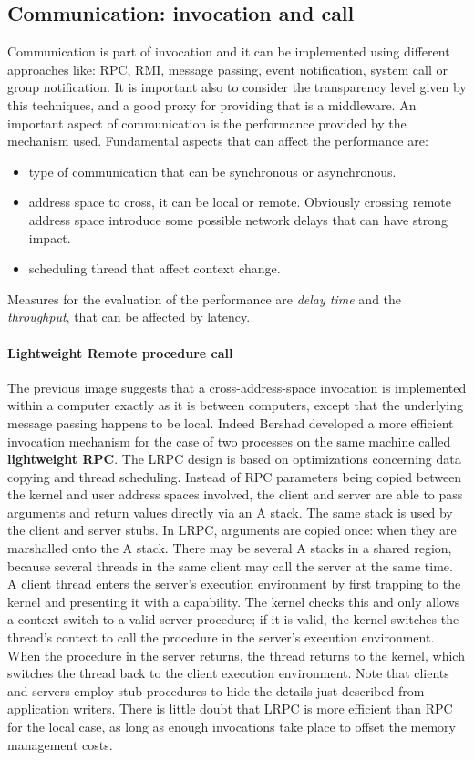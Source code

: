 \subsection{Communication: invocation and call}
Communication is part of invocation and it can be implemented using different approaches like: RPC, RMI, message passing, event notification, system call or group notification. It is important also to consider the transparency level given by this techniques, and a good proxy for providing that is a middleware. An important aspect of communication is the performance provided by the mechanism used. Fundamental aspects that can affect the performance are:
\begin{itemize}
	\item type of communication that can be synchronous or asynchronous.
	\item address space to cross, it can be local or remote. Obviously crossing remote address space introduce some possible network delays that can have strong impact.
	\item scheduling thread that affect context change.
\end{itemize}
Measures for the evaluation of the performance are \textit{delay time} and the \textit{throughput}, that can be affected by latency.
\paragraph{Lightweight Remote procedure call}
The previous image suggests that a cross-address-space invocation is implemented within a computer exactly as it is between computers, except that the underlying message passing happens to be local. Indeed Bershad developed a more efficient invocation mechanism for the case of two processes on the same machine called \textbf{lightweight RPC}. The LRPC design is based on optimizations concerning data copying and thread scheduling. Instead of RPC parameters being copied between the kernel and user address spaces involved, the client and server are able to pass arguments and return values directly via an A stack. The same stack is used by the client and server stubs. In LRPC, arguments are copied once: when they are marshalled onto the A stack. There may be several A stacks in a shared region, because several threads in the same client may call the server at the same time.
A client thread enters the server’s execution environment by first trapping to the kernel and presenting it with a capability. The kernel checks this and only allows a context switch to a valid server procedure; if it is valid, the kernel switches the thread’s context to call the procedure in the server’s execution environment. When the procedure in the server returns, the thread returns to the kernel, which switches the thread back to the client execution environment. Note that clients and servers employ stub procedures to hide the details just described from application writers. There is little doubt that LRPC is more efficient than RPC for the local case, as long as enough invocations take place to offset the memory management costs.

